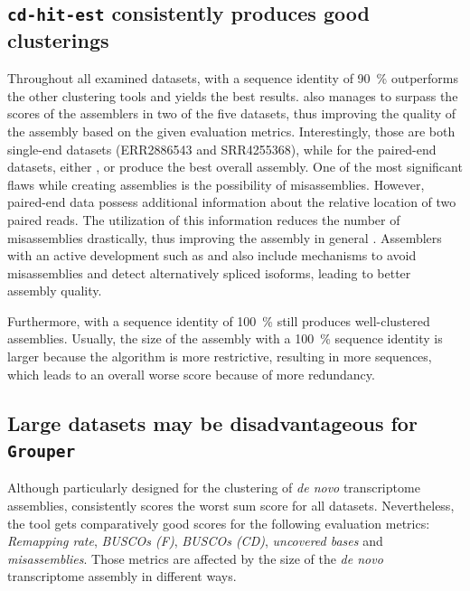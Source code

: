 \documentclass[12pt,a4paper,english]{article}
\begin{document}
	\subsection{\texttt{cd-hit-est} consistently produces good clusterings}
		\label{ssec:cdhit_is_best}
        Throughout all examined datasets, \cdhit with a sequence identity of 90~\% outperforms the other clustering tools and yields the best results. \cdhit also manages to surpass the scores of the assemblers in two of the five datasets, thus improving the quality of the assembly based on the given evaluation metrics. Interestingly, those are both single-end datasets (ERR2886543 and SRR4255368), while for the paired-end datasets, either \spades, \soap or \trinity produce the best overall assembly.
		One of the most significant flaws while creating assemblies is the possibility of misassemblies. However, paired-end data possess additional information about the relative location of two paired reads.
		The utilization of this information reduces the number of misassemblies drastically, thus improving the assembly in general \citep{misassembly:15}.    
		Assemblers with an active development such as \spades \citep{rnaSPAdes:18} and \trinity \citep{Trinity:11} also include mechanisms to avoid misassemblies and detect alternatively spliced isoforms, leading to better assembly quality.
		
		Furthermore, \cdhit with a sequence identity of 100~\% still produces well-clustered assemblies. Usually, the size of the assembly with a 100~\% sequence identity is larger because the algorithm is more restrictive, resulting in more sequences, which leads to an overall worse score because of more redundancy.
	
	\subsection{Large datasets may be disadvantageous for \texttt{Grouper}}
		\label{ssec:discussion:grouper}
		Although particularly designed for the clustering of \textit{de novo} transcriptome assemblies, \grouper consistently scores the worst sum score for all datasets.
		Nevertheless, the tool gets comparatively good scores for the following evaluation metrics: \textit{Remapping rate}, \textit{BUSCOs (F)}, \textit{BUSCOs (CD)}, \textit{uncovered bases} and \textit{misassemblies}.
		Those metrics are affected by the size of the \textit{de novo} transcriptome assembly in different ways.
		
\end{document}
